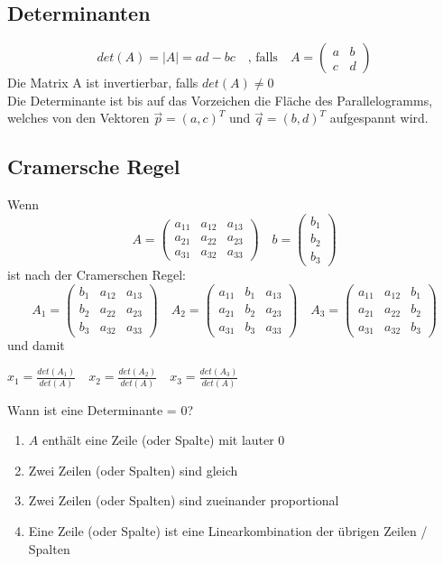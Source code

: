 \documentclass{report}
\begin{document}
\subsection{Determinanten}
\begin{equation}det(A) = |A| = ad-bc \quad \mbox{, falls} \quad A = \left(\begin{matrix}a & b\\c & d\end{matrix}\right) \end{equation}
Die Matrix A ist invertierbar, falls $det(A) \neq 0$\\
Die Determinante ist bis auf das Vorzeichen die Fläche des Parallelogramms, welches von den Vektoren $\vec{p} = (a,c)^T$ und $\vec{q} = (b,d)^T$ aufgespannt wird.
\subsection{Cramersche Regel}
Wenn
\begin{equation}A=\left(\begin{matrix}a_{11} & a_{12} & a_{13}\\a_{21} & a_{22} & a_{23}\\a_{31} & a_{32} & a_{33}\end{matrix}\right) \quad b = \left(\begin{matrix}b_1\\b_2\\b_3\end{matrix}\right)\end{equation}
ist nach der Cramerschen Regel:\\
\begin{equation}A_1=\left(\begin{matrix}b_1 & a_{12} & a_{13}\\b_2 & a_{22} & a_{23}\\b_3 & a_{32} & a_{33}\end{matrix}\right) \quad A_2=\left(\begin{matrix}a_{11} & b_1 & a_{13}\\a_{21} & b_2 & a_{23}\\a_{31} & b_3 & a_{33}\end{matrix}\right) \quad A_3=\left(\begin{matrix}a_{11} & a_{12} & b_1\\a_{21} & a_{22} & b_2\\a_{31} & a_{32} & b_3\end{matrix}\right)\end{equation}
und damit
\begin{center}
$x_1 = \frac{det(A_1)}{det(A)} \quad x_2 = \frac{det(A_2)}{det(A)} \quad x_3 = \frac{det(A_3)}{det(A)}$
\end{center}
Wann ist eine Determinante = 0?
\begin{enumerate}
\item $A$ enthält eine Zeile (oder Spalte) mit lauter 0
\item Zwei Zeilen (oder Spalten) sind gleich
\item Zwei Zeilen (oder Spalten) sind zueinander proportional
\item Eine Zeile (oder Spalte) ist eine Linearkombination der übrigen Zeilen / Spalten\end{enumerate}
\end{document}
